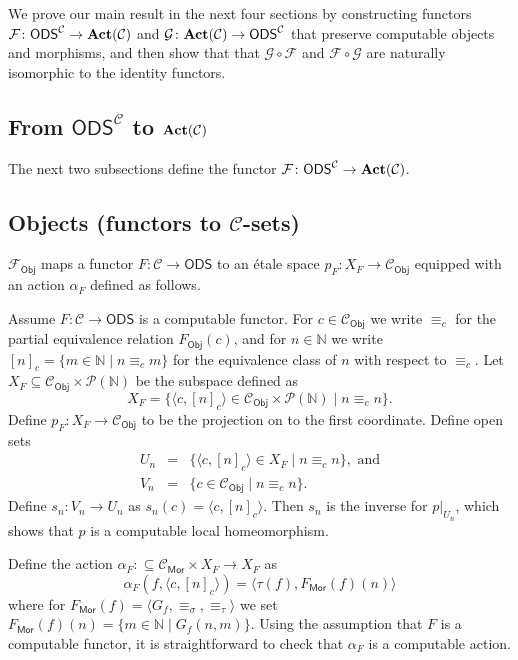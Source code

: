 \documentclass[envcountsame]{llncs}
\def\IN{{\mathbb N}}
\def\calC{{\mathcal{C}}}
\def\calF{{\mathcal{F}}}
\def\calG{{\mathcal{G}}}
\def\calP{{\mathcal{P}}}
\newcommand{\cntSets}{{\mathsf{ODS}}}
\newcommand{\Mor}{\mathsf{Mor}}
\newcommand{\Obj}{\mathsf{Obj}}
\def\src{{\sigma}}
\def\tar{{\tau}}
\def\act{{\mathrm{\bold{Act}}}}
\begin{document}
We prove our main result in the next four sections by constructing functors $\calF\colon \cntSets^\calC \to \act(\calC)$ and $\calG\colon \act(\calC) \to \cntSets^\calC$ that preserve computable objects and morphisms, and then show that that $\calG\circ\calF$ and $\calF\circ\calG$ are naturally isomorphic to the identity functors.

\subsection{From $\cntSets^\calC$ to $\act(\calC)$}\label{subsec:functor2espace}

The next two subsections define the functor $\calF\colon \cntSets^\calC \to \act(\calC)$.

\subsection*{Objects (functors to $\calC$-sets)}

$\calF_\Obj$ maps a functor $F\colon \calC\to\cntSets$ to an \'{e}tale space $p_F\colon X_F\to\calC_\Obj$ equipped with an action $\alpha_F$ defined as follows.

Assume $F\colon \calC \to\cntSets$ is a computable functor. For $c\in\calC_\Obj$ we write $\equiv_c$ for the partial equivalence relation $F_{\Obj}(c)$, and for $n\in\IN$ we write $[n]_c=\{ m\in\IN\mid n \equiv_c m\}$ for the equivalence class of $n$ with respect to $\equiv_c$. Let $X_F\subseteq \calC_\Obj\times \calP(\IN)$ be the subspace defined as 
\[X_F = \{ \langle c, [n]_c \rangle \in \calC_\Obj \times \calP(\IN) \mid n \equiv_c n\}.\]
Define $p_F\colon X_F\to\calC_\Obj$ to be the projection on to the first coordinate. Define open sets
\begin{eqnarray*}
U_n &=& \{\langle c, [n]_c \rangle \in X_F\mid  n \equiv_c n \},\text{ and}\\
V_n &=& \{ c\in \calC_\Obj \mid n \equiv_c n \}.
\end{eqnarray*}
Define $s_n\colon V_n \to U_n$ as $s_n(c)=\langle c,[n]_c\rangle$. Then $s_n$ is the inverse for $p|_{U_n}$, which shows that $p$ is a computable local homeomorphism.

Define the action $\alpha_F:\subseteq \calC_\Mor \times X_F \to X_F$ as 
\[\alpha_F(f,\langle c, [n]_c \rangle) = \langle \tar(f), F_\Mor(f)(n)\rangle\]
where  for $F_\Mor(f) = \langle G_f, \equiv_\src, \equiv_\tar\rangle$ we set $F_\Mor(f)(n)=\{m\in\IN \mid G_f(n,m)\}$. Using the assumption that $F$ is a computable functor, it is straightforward to check that $\alpha_F$ is a computable action.
\end{document}
